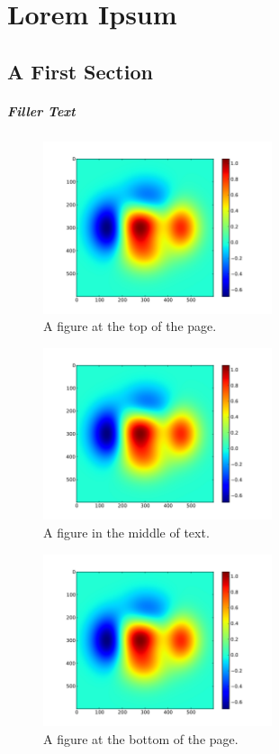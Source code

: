\chapter{Lorem Ipsum}

\section*{A First Section}

\paragraph{Filler Text} \lipsum[1-6]
%
\begin{figure}[t]
  \centering
  \includegraphics[width=0.6\textwidth]{Chapter-2/figs/color}
  \caption{A figure at the top of the page.}
  \label{fig:ch3.1}
\end{figure}
%
\lipsum[7-13]
%
\begin{figure}[!h]
  \centering
  \includegraphics[width=0.6\textwidth]{Chapter-2/figs/color}
  \caption{A figure in the middle of text.}
  \label{fig:ch3.2}
\end{figure}
%
\begin{figure}[!b]
  \centering
  \includegraphics[width=0.6\textwidth]{Chapter-2/figs/color}
  \caption{A figure at the bottom of the page.}
  \label{fig:ch3.3}
\end{figure}
%
\lipsum[14-20]
